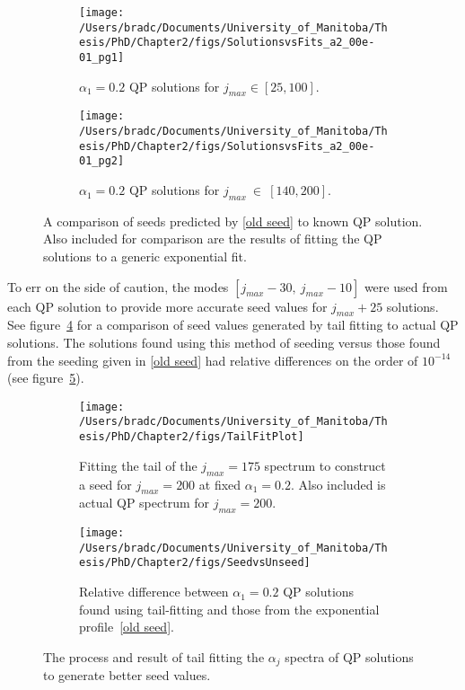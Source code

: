 \documentclass[../PhD.tex]{subfiles}
\begin{document}
\begin{subappendices}
\begin{figure}[h]
\centering
	\begin{subfigure}[t]{0.45\textwidth}
		\texttt{[image: /Users/bradc/Documents/University\_of\_Manitoba/Thesis/PhD/Chapter2/figs/SolutionsvsFits\_a2\_00e-01\_pg1]}
		\caption{$\alpha_1 = 0.2$ QP solutions for $j_{max} \in [25,100]$.}
		\label{fig: sol vs fit low jmax}
	\end{subfigure}
	\quad
	\begin{subfigure}[t]{0.45\textwidth}
		\texttt{[image: /Users/bradc/Documents/University\_of\_Manitoba/Thesis/PhD/Chapter2/figs/SolutionsvsFits\_a2\_00e-01\_pg2]}
		\caption{$\alpha_1 = 0.2$ QP solutions for $j_{max}~\in~[140,200]$.}
		\label{fig: sol vs fit high jmax}
	\end{subfigure}
	\caption{A comparison of seeds predicted by \eqref{old seed} to known QP solution. Also included for comparison are the results of fitting the QP solutions to a generic exponential fit.}
	\label{fig: solutionfitting}
\end{figure}
			

To err on the side of caution, the modes $[ j_{max} - 30,\: j_{max} - 10]$ were used from each QP solution to provide more accurate seed values for $j_{max} + 25$ solutions. See figure~\ref{fig: tail fitting} for a comparison of seed values generated by tail fitting to actual QP solutions. The solutions found using this method of seeding versus those found from the seeding given in \eqref{old seed} had relative differences on the order of $10^{-14}$ (see figure~\ref{fig: seedvsunseed}).

\begin{figure}[h]
	\centering
	\begin{subfigure}[t]{0.45\textwidth}
  		\texttt{[image: /Users/bradc/Documents/University\_of\_Manitoba/Thesis/PhD/Chapter2/figs/TailFitPlot]}
  		\caption{Fitting the tail of the $j_{max} = 175$ spectrum to construct a seed for $j_{max} = 200$ at fixed $\alpha_1 = 0.2$. Also included is actual QP spectrum for $j_{max} = 200$.}
  		\label{fig: tail fitting}
	\end{subfigure}
	\;
	\begin{subfigure}[t]{0.45\textwidth}
		\texttt{[image: /Users/bradc/Documents/University\_of\_Manitoba/Thesis/PhD/Chapter2/figs/SeedvsUnseed]}
		\caption{Relative difference between $\alpha_1=0.2$ QP solutions found using tail-fitting and those from the exponential profile~\eqref{old seed}.}
		\label{fig: seedvsunseed}
	\end{subfigure}
	\caption{The process and result of tail fitting the $\alpha_j$ spectra of QP solutions to generate better seed values.}
   	\label{fig: fit & resids}
\end{figure}


\end{subappendices}
\end{document}
